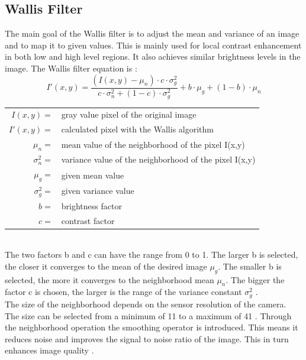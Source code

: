 \subsection{Wallis Filter}\label{ch:th_wallis_filter}
The main goal of the Wallis filter is to adjust the mean and variance of an
image and to map it to given values. This is mainly used for local contrast
enhancement in both low and high level regions. It also achieves similar brightness levels in the image.
The Wallis filter equation is \cite{wallis_filter}:
\begin{equation}
    I'(x,y) = \frac{( I(x,y) - \mu_{n})\cdot c \cdot \sigma_{g}^{2}}{c \cdot \sigma_{n}^{2} + (1 - c) \cdot \sigma_{g}^{2}} + b \cdot \mu_{g} + (1 - b) \cdot \mu_{n}
    \label{eq:wallis_filter}
\end{equation} 

\begin{tabular}{rl}
    $I(x,y)         =$ & gray value pixel of the original image \\
    $I'(x,y)        =$ & calculated pixel with the Wallis algorithm \\
    $\mu_{n}        =$ & mean value of the neighborhood of the pixel I(x,y) \\
    $\sigma_{n}^{2} =$ & variance value of the neighborhood of the pixel I(x,y) \\
    $\mu_{g}        =$ & given mean value\\
    $\sigma_{g}^{2} =$ & given variance value\\
    $b              =$ & brightness factor \\
    $c              =$ & contrast factor \\
\end{tabular} \\

The two factors b and c can have the range from 0 to 1. The larger b is
selected, the closer it converges to the mean of the desired image $\mu_{g}$. The smaller b is selected, the more it converges to the neighborhood mean $\mu_{n}$.
The bigger the factor c is chosen, the larger is the range of the variance constant $\sigma_{g}^{2}$ \cite{wallis_filter}. \\
The size of the neighborhood depends on the sensor resolution of the camera. The size can be selected from a minimum of 11 to a maximum of 41 \cite{zeng_2018}. Through the neighborhood operation the smoothing operator is introduced. This means it reduces noise and improves the signal to noise ratio of the image. This in turn enhances image quality \cite{wallis_filter}.

